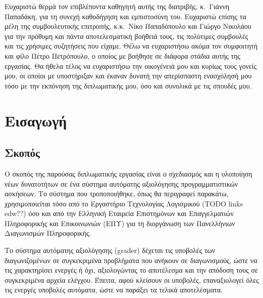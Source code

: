 \documentclass[diploma]{softlab-thesis}
\begin{document}

\begin{acknowledgementsgr}
Ευχαριστώ θερμά τον επιβλέποντα καθηγητή αυτής της διατριβής,
κ.~Γιάννη Παπαδάκη, για τη συνεχή καθοδήγηση και εμπιστοσύνη
του. Ευχαριστώ επίσης τα μέλη της συμβουλευτικής επιτροπής,
κ.κ.~Νίκο Παπαδόπουλο και Γιώργο Νικολάου για την πρόθυμη και
πάντα αποτελεσματική βοήθειά τους, τις πολύτιμες συμβουλές και
τις χρήσιμες συζητήσεις που είχαμε.  Θέλω να ευχαριστήσω ακόμα
τον συμφοιτητή και φίλο Πέτρο Πετρόπουλο, ο οποίος με βοήθησε σε
διάφορα στάδια αυτής της εργασίας.  Θα ήθελα τέλος να ευχαριστήσω
την οικογένειά μου και κυρίως τους γονείς μου, οι οποίοι με
υποστήριξαν και έκαναν δυνατή την απερίσπαστη ενασχόλησή μου τόσο
με την εκπόνηση της διπλωματικής μου, όσο και συνολικά με τις
σπουδές μου.
\end{acknowledgementsgr}



\tableofcontents
\listoftables
\listoffigures



\mainmatter

\chapter{Εισαγωγή}

\section{Σκοπός}

Ο σκοπός της παρούσας διπλωματικής εργασίας είναι ο σχεδιασμός
και η υλοποίηση νέων δυνατοτήτων σε ένα σύστημα αυτόματης αξιολόγησης
προγραμματιστικών ασκήσεων. Το σύστημα που τροποποιήθηκε, όπως θα περιγραφεί
παρακάτω, χρησιμοποιείται τόσο από το Εργαστήριο Τεχνολογίας Λογισμικού (ΤODO links edw??)
όσο και από την Ελληνική Εταιρεία Επιστημόνων και Επαγγελματιών Πληροφορικής
και Επικοινωνιών (ΕΠΥ) για τη διοργάνωση των Πανελλήνιων Διαγωνισμών Πληροφορικής.

\bigskip

Το σύστημα αυτόματης αξιολόγησης (grader) δέχεται τις υποβολές των
διαγωνιζομένων σε συγκεκριμένα προβλήματα που ανήκουν σε διαγωνισμούς,
ώστε να τις χαρακτηρίσει ενεργές ή όχι, αξιολογώντας
το αποτέλεσμα και την απόδοση τους σε συγκεκριμένα αρχεία ελέγχου.
Έπειτα, αφού κλείσουν οι υποβολές, επαναξιολογεί όλες τις ενεργές
υποβολές αυτόματα, ώστε να παράξει τα τελικά αποτελέσματα.
\end{document}
